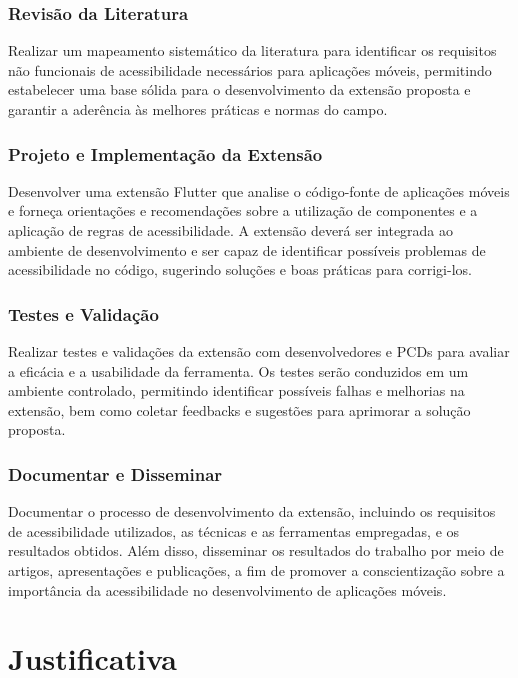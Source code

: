 \subsubsection{Revisão da Literatura}

Realizar um mapeamento sistemático da literatura para identificar os requisitos não funcionais de acessibilidade necessários para aplicações móveis, permitindo estabelecer uma base sólida para o desenvolvimento da extensão proposta e garantir a aderência às melhores práticas e normas do campo.

\subsubsection{Projeto e Implementação da Extensão}

Desenvolver uma extensão Flutter que analise o código-fonte de aplicações móveis e forneça orientações e recomendações sobre a utilização de componentes e a aplicação de regras de acessibilidade. A extensão deverá ser integrada ao ambiente de desenvolvimento e ser capaz de identificar possíveis problemas de acessibilidade no código, sugerindo soluções e boas práticas para corrigi-los.

\subsubsection{Testes e Validação}

Realizar testes e validações da extensão com desenvolvedores e PCDs para avaliar a eficácia e a usabilidade da ferramenta. Os testes serão conduzidos em um ambiente controlado, permitindo identificar possíveis falhas e melhorias na extensão, bem como coletar feedbacks e sugestões para aprimorar a solução proposta.

\subsubsection{Documentar e Disseminar}

Documentar o processo de desenvolvimento da extensão, incluindo os requisitos de acessibilidade utilizados, as técnicas e as ferramentas empregadas, e os resultados obtidos. Além disso, disseminar os resultados do trabalho por meio de artigos, apresentações e publicações, a fim de promover a conscientização sobre a importância da acessibilidade no desenvolvimento de aplicações móveis.

\section{Justificativa}

